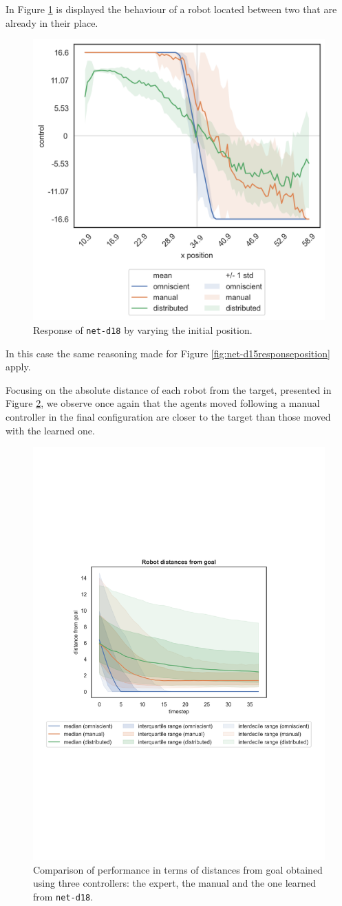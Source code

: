 In Figure \ref{fig:net-d18responseposition} is displayed the behaviour of a robot 
located between two that are already in their place.
\begin{figure}[!htb]
	\centering
	\includegraphics[width=.45\textwidth]{contents/images/net-d18/response-varying_init_position-distributed}%
	\caption{Response of \texttt{net-d18} by varying the initial position.}
	\label{fig:net-d18responseposition}
\end{figure}
In this case the same reasoning made for Figure 
\ref{fig:net-d15responseposition} apply.

Focusing on the absolute distance of each robot from the target, presented in 
Figure \ref{fig:net-d18distance}, we observe once again that the agents moved 
following a manual controller in the final configuration are closer to the target 
than those moved with the learned one.
\begin{figure}[!htb]
	\centering
	\includegraphics[width=.65\textwidth]{contents/images/net-d18/distances-from-goal-compressed-distributed}%
	\caption[Evaluation of \texttt{net-d18} distances from goal.]{Comparison of 
		performance in terms of distances from goal obtained using three 
		controllers: the expert, the manual and the one learned from 
		\texttt{net-d18}.}
	\label{fig:net-d18distance}
\end{figure}

